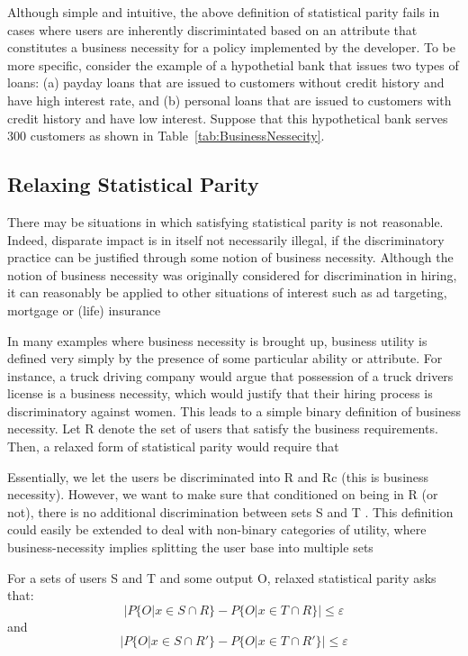 Although simple and intuitive, the above definition of statistical parity fails
in cases where users are inherently discrimintated based on an attribute that
constitutes a business necessity for a policy implemented by the developer.
To be more specific, consider the example of a hypothetial bank that issues two
types of loans: (a) payday loans that are issued to customers without credit
history and have high interest rate, and (b) personal loans that are issued to
customers with credit history and have low interest. Suppose that this
hypothetical bank serves 300 customers as shown in
Table~\ref{tab:BusinessNessecity}.



\subsection{Relaxing Statistical Parity}
There may be situations in which satisfying statistical parity is not reasonable. Indeed, disparate
impact is in itself not necessarily illegal, if the discriminatory practice can be justified
through some notion of business necessity. Although the notion of business necessity was
originally considered for discrimination in hiring, it can reasonably be applied to other situations
of interest such as ad targeting, mortgage or (life) insurance

In many examples where business necessity is brought up, business utility is defined very
simply by the presence of some particular ability or attribute. For instance, a truck
driving company would argue that possession of a truck drivers license is a business necessity,
which would justify that their hiring process is discriminatory against women.
This leads to a simple binary definition of business necessity. Let R denote the set of
users that satisfy the business requirements. Then, a relaxed form of statistical parity would
require that

Essentially, we let the users be discriminated into R and Rc (this is business necessity).
However, we want to make sure that conditioned on being in R (or not), there is no additional
discrimination between sets S and T .
This definition could easily be extended to deal with non-binary categories of utility,
where business-necessity implies splitting the user base into multiple sets

For a sets of users S and T and some output O, relaxed statistical parity asks that:
\begin{equation}
|P\{O | x \in S \cap R\} - P\{O | x \in T \cap R\}| \le \varepsilon
\label{eq:RelaxedStatisticalParityA}
\end{equation}
and
\begin{equation}
|P\{O | x \in S \cap R'\} - P\{O | x \in T \cap R'\}| \le \varepsilon
\label{eq:RelaxedStatisticalParityB}
\end{equation}


